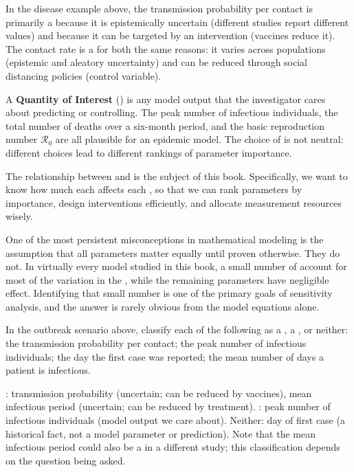In the disease example above, the transmission probability
per contact is primarily a \POI because it is epistemically uncertain
(different studies report different values) and because it can be
targeted by an intervention (vaccines reduce it).
The contact rate is a \POI for both the same reasons:
it varies across populations (epistemic and aleatory uncertainty)
and can be reduced through social distancing policies (control variable).

A \textbf{Quantity of Interest} (\QOI) is any model output that the
investigator cares about predicting or controlling. The peak number of
infectious individuals, the total number of deaths over a six-month
period, and the basic reproduction number $\mathcal{R}_0$ are all
plausible \QOIs for an epidemic model. The choice of \QOI is not neutral:
different choices lead to different rankings of parameter importance.

The relationship between \POIs and \QOIs is the subject of this book.
Specifically, we want to know how much each \POI affects each \QOI,
so that we can rank parameters by importance, design interventions
efficiently, and allocate measurement resources wisely.

One of the most persistent misconceptions in mathematical modeling
is the assumption that all parameters matter equally until proven
otherwise. They do not. In virtually every model studied in this
book, a small number of \POIs account for most of the variation
in the \QOIs, while the remaining parameters have negligible effect.
Identifying that small number is one of the primary goals of
sensitivity analysis, and the answer is rarely obvious from the
model equations alone.

\begin{selfcheck}
In the outbreak scenario above, classify each of the following
as a \POI, a \QOI, or neither:
the transmission probability per contact;
the peak number of infectious individuals;
the day the first case was reported;
the mean number of days a patient is infectious.
\end{selfcheck}
\begin{scAnswer}
\POI: transmission probability (uncertain; can be reduced by vaccines),
mean infectious period (uncertain; can be reduced by treatment).
\QOI: peak number of infectious individuals (model output we care about).
Neither: day of first case (a historical fact, not a model parameter
or prediction). Note that the mean infectious period could also be
a \QOI in a different study; this classification depends on
the question being asked.
\end{scAnswer}

